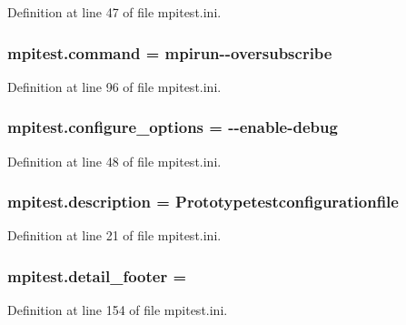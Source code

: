 Definition at line 47 of file mpitest.\-ini.

\hypertarget{namespacempitest_a47e2cc8f7e7a5ee1717d68777fd3c363}{
\subsubsection[{command}]{\setlength{\rightskip}{0pt plus 5cm}mpitest.\-command = mpirun-\/-\/oversubscribe}}\label{namespacempitest_a47e2cc8f7e7a5ee1717d68777fd3c363}


Definition at line 96 of file mpitest.\-ini.

\hypertarget{namespacempitest_ac530ff92b31cfd595a3fc3c3a82d7fc6}{
\subsubsection[{configure\-\_\-options}]{\setlength{\rightskip}{0pt plus 5cm}mpitest.\-configure\-\_\-options = -\/-\/enable-\/debug}}\label{namespacempitest_ac530ff92b31cfd595a3fc3c3a82d7fc6}


Definition at line 48 of file mpitest.\-ini.

\hypertarget{namespacempitest_ab3988561c8669a528d164bb087dfaba8}{
\subsubsection[{description}]{\setlength{\rightskip}{0pt plus 5cm}mpitest.\-description = Prototypetestconfigurationfile}}\label{namespacempitest_ab3988561c8669a528d164bb087dfaba8}


Definition at line 21 of file mpitest.\-ini.

\hypertarget{namespacempitest_a3f742d28fd4486162a251a03685b28d0}{
\subsubsection[{detail\-\_\-footer}]{\setlength{\rightskip}{0pt plus 5cm}mpitest.\-detail\-\_\-footer =}}\label{namespacempitest_a3f742d28fd4486162a251a03685b28d0}


Definition at line 154 of file mpitest.\-ini.

